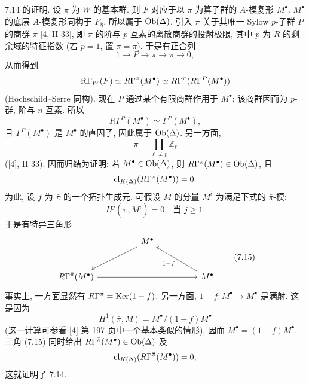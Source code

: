 7.14 的证明. 设 $\pi$ 为 $W$ 的基本群. 则 $F$ 对应于以 $\pi$ 为算子群的 $A$-模复形 $M^\bullet$. $M^\bullet$ 的底层 $A$-模复形同构于 $F_{\bar\eta}$, 所以属于 $\operatorname{Ob}(\Delta)$. 引入 $\pi$ 关于其唯一 Sylow $p$-子群 $P$ 的商群 $\bar\pi$ [4, II 33], 即 $\pi$ 的阶与 $p$ 互素的离散商群的投射极限, 其中 $p$ 为 $R$ 的剩余域的特征指数 (若 $p=1$, 置 $\bar\pi=\pi$). 于是有正合列
\[
1\longrightarrow P\longrightarrow \pi\longrightarrow \bar\pi\longrightarrow0,
\]
从而得到
\[
\mathrm R\Gamma_W(F)\simeq R\Gamma^\pi(M^\bullet)
\simeq R\Gamma^{\bar\pi}(R\Gamma^P(M^\bullet))
\]
(Hochschild--Serre 同构). 现在 $P$ 通过某个有限商群作用于 $M^\bullet$; 该商群因而为 $p$-群, 阶与 $n$ 互素. 所以
\[
R\Gamma^P(M^\bullet)\simeq \Gamma^P(M^\bullet),
\]
且 $\Gamma^P(M^\bullet)$ 是 $M^\bullet$ 的直因子, 因此属于 $\operatorname{Ob}(\Delta)$. 另一方面,
\[
\bar\pi=\prod_{\ell\ne p}\mathbb Z_\ell
\]
([4], II 33). 因而归结为证明: 若 $M^\bullet\in\operatorname{Ob}(\Delta)$, 则 $R\Gamma^{\bar\pi}(M^\bullet)\in\operatorname{Ob}(\Delta)$, 且
\[
\operatorname{cl}_{K(\Delta)}(R\Gamma^{\bar\pi}(M^\bullet))=0.
\]
为此, 设 $f$ 为 $\bar\pi$ 的一个拓扑生成元. 可假设 $M$ 的分量 $M^i$ 为满足下式的 $\bar\pi$-模:
\[
H^j(\bar\pi,M^i)=0\quad\text{当 }j\ge1.
\]
于是有特异三角形
\[
\begin{tikzcd}[column sep=huge,row sep=large]
& M^\bullet \arrow[dl] &\\
R\Gamma^{\bar\pi}(M^\bullet) \arrow[rr] && M^\bullet \arrow[ul,"1-f"]
\end{tikzcd}
\tag{7.15}
\]
事实上, 一方面显然有 $R\Gamma^{\bar\pi}=\operatorname{Ker}(1-f)$. 另一方面, $1-f:M^\bullet\to M^\bullet$ 是满射. 这是因为
\[
H^1(\bar\pi,M)=M^\bullet/(1-f)M^\bullet
\]
(这一计算可参看 [4] 第 197 页中一个基本类似的情形), 因而 $M^\bullet=(1-f)M^\bullet$. 三角 (7.15) 同时给出 $R\Gamma^{\bar\pi}(M^\bullet)\in\operatorname{Ob}(\Delta)$ 及
\[
\operatorname{cl}_{K(\Delta)}(R\Gamma^{\bar\pi}(M^\bullet))=0,
\]
这就证明了 7.14.

